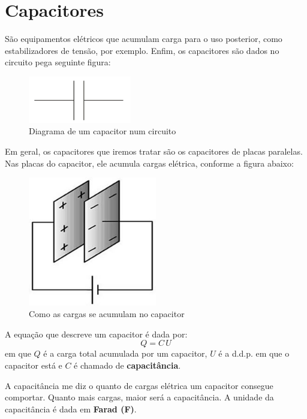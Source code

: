 \documentclass[12pt]{extarticle}
\newcommand{\<}{\langle}
\renewcommand{\>}{\rangle}
\theoremstyle{definition}
\begin{document}
\section{Capacitores}
São equipamentos elétricos que acumulam carga para o uso posterior, como estabilizadores de tensão, por exemplo. Enfim, os capacitores são dados no circuito pega seguinte figura:
\begin{figure}[H]
    \centering
    \includegraphics[width=0.4\textwidth]{capacitor.png}
    \caption{Diagrama de um capacitor num circuito}
    \label{fig:capacitor}
\end{figure}

Em geral, os capacitores que iremos tratar são os capacitores de placas paralelas. Nas placas do capacitor, ele acumula cargas elétrica, conforme a figura abaixo:
\begin{figure}[H]
    \centering
    \includegraphics[width=0.5\textwidth]{capacitor_placas_paralelas.jpg}
    \caption{Como as cargas se acumulam no capacitor}
    \label{fig:placas_paralelas}
\end{figure}

A equação que descreve um capacitor é dada por:
\begin{equation}
    Q=C\,U
\end{equation}
\noindent em que $Q$ é a carga total acumulada por um capacitor, $U$ é a d.d.p. em que o capacitor está e $C$ é chamado de \textbf{capacitância}.

A capacitância me diz o quanto de cargas elétrica um capacitor consegue comportar. Quanto mais cargas, maior será a capacitância. A unidade da capacitância é dada em \textbf{Farad (F)}.
\end{document}
